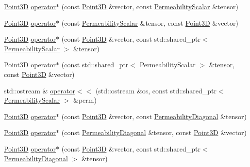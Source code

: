 \begin{DoxyCompactItemize}
\item 
\hyperlink{classFVCode3D_1_1Point3D}{Point3D} \hyperlink{namespaceFVCode3D_a9ce5cab99db49bc50167ff3705fac221}{operator$\ast$} (const \hyperlink{classFVCode3D_1_1Point3D}{Point3D} \&vector, const \hyperlink{classFVCode3D_1_1PermeabilityScalar}{Permeability\+Scalar} \&tensor)
\item 
\hyperlink{classFVCode3D_1_1Point3D}{Point3D} \hyperlink{namespaceFVCode3D_a5c756733d1283495ba727f5b8a0e4ab9}{operator$\ast$} (const \hyperlink{classFVCode3D_1_1PermeabilityScalar}{Permeability\+Scalar} \&tensor, const \hyperlink{classFVCode3D_1_1Point3D}{Point3D} \&vector)
\item 
\hyperlink{classFVCode3D_1_1Point3D}{Point3D} \hyperlink{namespaceFVCode3D_a9e5a2a2718342bee157a1c6e2c78fa6e}{operator$\ast$} (const \hyperlink{classFVCode3D_1_1Point3D}{Point3D} \&vector, const std\+::shared\+\_\+ptr$<$ \hyperlink{classFVCode3D_1_1PermeabilityScalar}{Permeability\+Scalar} $>$ \&tensor)
\item 
\hyperlink{classFVCode3D_1_1Point3D}{Point3D} \hyperlink{namespaceFVCode3D_a6e6874314b749e7b94c1e0f7b2e25ddc}{operator$\ast$} (const std\+::shared\+\_\+ptr$<$ \hyperlink{classFVCode3D_1_1PermeabilityScalar}{Permeability\+Scalar} $>$ \&tensor, const \hyperlink{classFVCode3D_1_1Point3D}{Point3D} \&vector)
\item 
std\+::ostream \& \hyperlink{namespaceFVCode3D_afcbf0ace1266ac69b82a7154d94459a1}{operator$<$$<$} (std\+::ostream \&os, const std\+::shared\+\_\+ptr$<$ \hyperlink{classFVCode3D_1_1PermeabilityScalar}{Permeability\+Scalar} $>$ \&perm)
\item 
\hyperlink{classFVCode3D_1_1Point3D}{Point3D} \hyperlink{namespaceFVCode3D_ab694abb1eb8ba46250bf127f3032d0bd}{operator$\ast$} (const \hyperlink{classFVCode3D_1_1Point3D}{Point3D} \&vector, const \hyperlink{classFVCode3D_1_1PermeabilityDiagonal}{Permeability\+Diagonal} \&tensor)
\item 
\hyperlink{classFVCode3D_1_1Point3D}{Point3D} \hyperlink{namespaceFVCode3D_a20d5c43bac77b6978cb71155386aaf9e}{operator$\ast$} (const \hyperlink{classFVCode3D_1_1PermeabilityDiagonal}{Permeability\+Diagonal} \&tensor, const \hyperlink{classFVCode3D_1_1Point3D}{Point3D} \&vector)
\item 
\hyperlink{classFVCode3D_1_1Point3D}{Point3D} \hyperlink{namespaceFVCode3D_a84db6637fe253b4e6acd9bd16d887562}{operator$\ast$} (const \hyperlink{classFVCode3D_1_1Point3D}{Point3D} \&vector, const std\+::shared\+\_\+ptr$<$ \hyperlink{classFVCode3D_1_1PermeabilityDiagonal}{Permeability\+Diagonal} $>$ \&tensor)

\end{DoxyCompactItemize}
